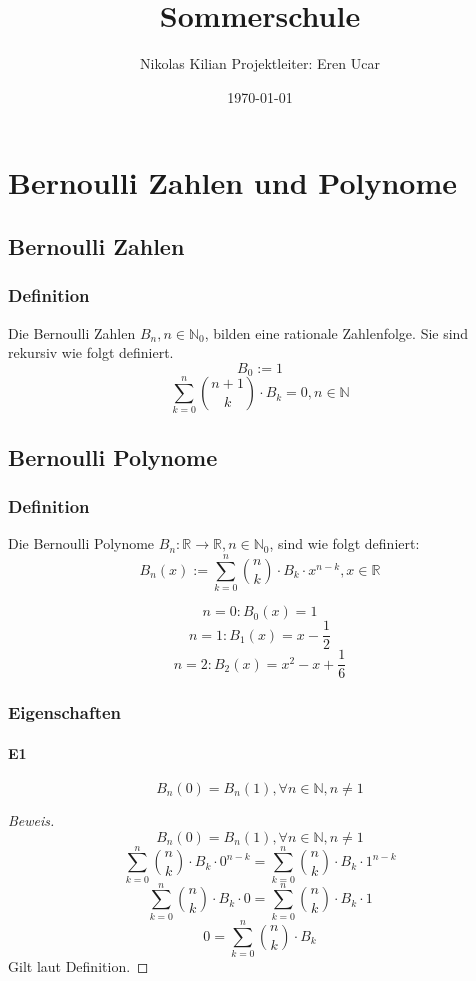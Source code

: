 \documentclass[12pt]{article}
\begin{document}
\title{\vspace{-2.0cm}Sommerschule}
\author{Nikolas Kilian
Projektleiter: Eren Ucar}
\date{\today}
\maketitle

\tableofcontents

\section{Bernoulli Zahlen und Polynome}
\subsection{Bernoulli Zahlen}
\subsubsection{Definition}

Die Bernoulli Zahlen \(B_n, n \in \mathbb{N}_0\), bilden eine rationale Zahlenfolge.
Sie sind rekursiv wie folgt definiert.
\[B_0 := 1\]
\[\sum_{k=0}^n {n+1 \choose k} \cdot B_k = 0, n \in \mathbb{N}\]

\subsection{Bernoulli Polynome}
\subsubsection{Definition}

Die Bernoulli Polynome \(B_n:\mathbb{R}\to\mathbb{R},n\in\mathbb{N}_0\), sind wie folgt definiert:
\[B_n(x) := \sum_{k=0}^n {n \choose k} \cdot B_k \cdot x^{n-k}, x\in\mathbb{R}\]

\[n = 0: B_0(x) = 1\]
\[n = 1: B_1(x) = x - \frac{1}{2}\]
\[n = 2: B_2(x) = x^2 - x + \frac{1}{6}\]

\subsubsection{Eigenschaften}
\paragraph{E1} 
\[B_n(0) = B_n(1), \forall n\in\mathbb{N}, n \neq 1\]

\begin{proof}[Beweis]
\[B_n(0) = B_n(1), \forall n\in\mathbb{N}, n \neq 1\]
\[\sum_{k=0}^n {n \choose k} \cdot B_k \cdot 0^{n-k} = \sum_{k=0}^n {n \choose k} \cdot B_k \cdot 1^{n-k}\]
\[\sum_{k=0}^n {n \choose k} \cdot B_k \cdot 0 = \sum_{k=0}^n {n \choose k} \cdot B_k \cdot 1\]
\[0 = \sum_{k=0}^n {n \choose k} \cdot B_k\]
Gilt laut Definition.
\end{proof}
\end{document}
